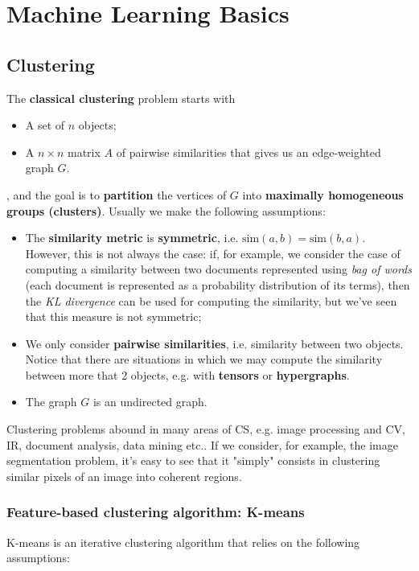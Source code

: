 \section{Machine Learning Basics}

\subsection{Clustering}
The \textbf{classical clustering} problem starts with 

\begin{itemize}
    \item A set of $n$ objects;
    \item A $n \times n$ matrix $A$ of pairwise similarities that gives us an edge-weighted graph $G$.
\end{itemize}

, and the goal is to \textbf{partition} the vertices of $G$ into \textbf{maximally homogeneous groups (clusters)}. Usually we make the following assumptions:

\begin{itemize}
    \item The \textbf{similarity metric} is \textbf{symmetric}, i.e. $\text{sim}(a,b) = \text{sim}(b,a)$. However, this is not always the case: if, for example, we consider the case of computing a similarity between two documents represented using \textit{bag of words} (each document is represented as a probability distribution of its terms), then the \textit{KL divergence} can be used for computing the similarity, but we've seen that this measure is not symmetric;
    \item We only consider \textbf{pairwise similarities}, i.e. similarity between two objects. Notice that there are situations in which we may compute the similarity between more that 2 objects, e.g. with \textbf{tensors} or \textbf{hypergraphs}.
    \item The graph $G$ is an undirected graph.
\end{itemize}


Clustering problems abound in many areas of CS, e.g. image processing and CV, IR, document analysis, data mining etc.. If we consider, for example, the image segmentation problem, it's easy to see that it "simply" consists in clustering similar pixels of an image into coherent regions. 

\subsubsection{Feature-based clustering algorithm: K-means}
K-means is an iterative clustering algorithm that relies on the following assumptions:


